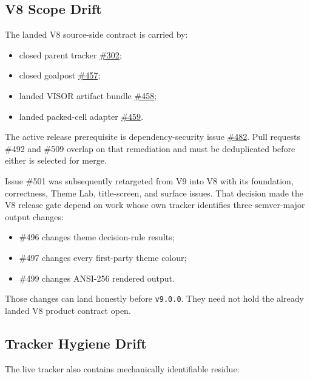 \subsection{V8 Scope Drift}\label{record-249-v8-scope-drift}

The landed V8 source-side contract is carried by:

\begin{itemize}
\tightlist
\item
  closed parent tracker \href{https://github.com/flyingrobots/bijou/issues/302}{\#302};
\item
  closed goalpost \href{https://github.com/flyingrobots/bijou/issues/457}{\#457};
\item
  landed VISOR artifact bundle \href{https://github.com/flyingrobots/bijou/issues/458}{\#458};
\item
  landed packed-cell adapter \href{https://github.com/flyingrobots/bijou/issues/459}{\#459}.
\end{itemize}

The active release prerequisite is dependency-security issue \href{https://github.com/flyingrobots/bijou/issues/482}{\#482}. Pull requests \#492 and \#509 overlap on that remediation and must be deduplicated before either is selected for merge.

Issue \#501 was subsequently retargeted from V9 into V8 with its foundation, correctness, Theme Lab, title-screen, and surface issues. That decision made the V8 release gate depend on work whose own tracker identifies three semver-major output changes:

\begin{itemize}
\tightlist
\item
  \#496 changes theme decision-rule results;
\item
  \#497 changes every first-party theme colour;
\item
  \#499 changes ANSI-256 rendered output.
\end{itemize}

Those changes can land honestly before \texttt{v\allowbreak{}9\allowbreak{}.\allowbreak{}0\allowbreak{}.\allowbreak{}0}. They need not hold the already landed V8 product contract open.

\subsection{Tracker Hygiene Drift}\label{record-249-tracker-hygiene-drift}

The live tracker also contains mechanically identifiable residue:

